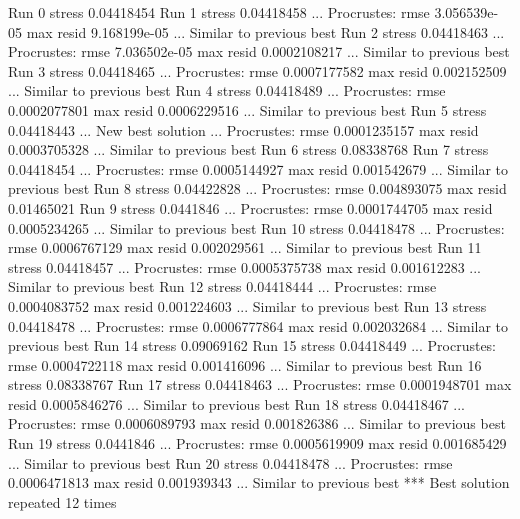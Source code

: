 \documentclass[
]{book}
\newenvironment{Shaded}{\begin{snugshade}}{\end{snugshade}}
\newcommand{\NormalTok}[1]{#1}
\begin{document}
\begin{Shaded}
\begin{Highlighting}[]
\NormalTok{Run 0 stress 0.04418454 }
\NormalTok{Run 1 stress 0.04418458 }
\NormalTok{... Procrustes: rmse 3.056539e{-}05  max resid 9.168199e{-}05 }
\NormalTok{... Similar to previous best}
\NormalTok{Run 2 stress 0.04418463 }
\NormalTok{... Procrustes: rmse 7.036502e{-}05  max resid 0.0002108217 }
\NormalTok{... Similar to previous best}
\NormalTok{Run 3 stress 0.04418465 }
\NormalTok{... Procrustes: rmse 0.0007177582  max resid 0.002152509 }
\NormalTok{... Similar to previous best}
\NormalTok{Run 4 stress 0.04418489 }
\NormalTok{... Procrustes: rmse 0.0002077801  max resid 0.0006229516 }
\NormalTok{... Similar to previous best}
\NormalTok{Run 5 stress 0.04418443 }
\NormalTok{... New best solution}
\NormalTok{... Procrustes: rmse 0.0001235157  max resid 0.0003705328 }
\NormalTok{... Similar to previous best}
\NormalTok{Run 6 stress 0.08338768 }
\NormalTok{Run 7 stress 0.04418454 }
\NormalTok{... Procrustes: rmse 0.0005144927  max resid 0.001542679 }
\NormalTok{... Similar to previous best}
\NormalTok{Run 8 stress 0.04422828 }
\NormalTok{... Procrustes: rmse 0.004893075  max resid 0.01465021 }
\NormalTok{Run 9 stress 0.0441846 }
\NormalTok{... Procrustes: rmse 0.0001744705  max resid 0.0005234265 }
\NormalTok{... Similar to previous best}
\NormalTok{Run 10 stress 0.04418478 }
\NormalTok{... Procrustes: rmse 0.0006767129  max resid 0.002029561 }
\NormalTok{... Similar to previous best}
\NormalTok{Run 11 stress 0.04418457 }
\NormalTok{... Procrustes: rmse 0.0005375738  max resid 0.001612283 }
\NormalTok{... Similar to previous best}
\NormalTok{Run 12 stress 0.04418444 }
\NormalTok{... Procrustes: rmse 0.0004083752  max resid 0.001224603 }
\NormalTok{... Similar to previous best}
\NormalTok{Run 13 stress 0.04418478 }
\NormalTok{... Procrustes: rmse 0.0006777864  max resid 0.002032684 }
\NormalTok{... Similar to previous best}
\NormalTok{Run 14 stress 0.09069162 }
\NormalTok{Run 15 stress 0.04418449 }
\NormalTok{... Procrustes: rmse 0.0004722118  max resid 0.001416096 }
\NormalTok{... Similar to previous best}
\NormalTok{Run 16 stress 0.08338767 }
\NormalTok{Run 17 stress 0.04418463 }
\NormalTok{... Procrustes: rmse 0.0001948701  max resid 0.0005846276 }
\NormalTok{... Similar to previous best}
\NormalTok{Run 18 stress 0.04418467 }
\NormalTok{... Procrustes: rmse 0.0006089793  max resid 0.001826386 }
\NormalTok{... Similar to previous best}
\NormalTok{Run 19 stress 0.0441846 }
\NormalTok{... Procrustes: rmse 0.0005619909  max resid 0.001685429 }
\NormalTok{... Similar to previous best}
\NormalTok{Run 20 stress 0.04418478 }
\NormalTok{... Procrustes: rmse 0.0006471813  max resid 0.001939343 }
\NormalTok{... Similar to previous best}
\NormalTok{*** Best solution repeated 12 times}
\end{Highlighting}
\end{Shaded}
\end{document}
